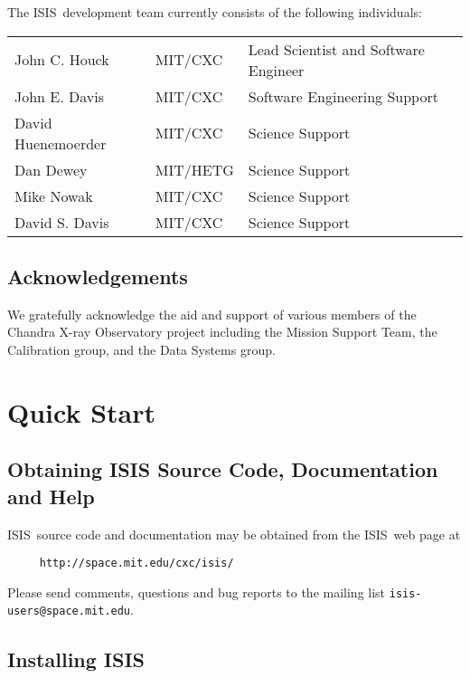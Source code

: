 \documentclass{book}
\newcommand{\isisx}{{\sc ISIS~}}
\begin{document}
The \isisx development team currently consists of the following individuals:

\begin{center}
\begin{tabular}{lll}
John C. Houck  \hspace{2.5cm}  & MIT/CXC \hspace{2.0cm} & Lead Scientist and Software Engineer\\
John E. Davis          & MIT/CXC & Software Engineering Support \\
David Huenemoerder     & MIT/CXC & Science Support \\
Dan Dewey              & MIT/HETG & Science Support \\
Mike Nowak             & MIT/CXC & Science Support \\
David S. Davis         & MIT/CXC & Science Support \\
\end{tabular}
\end{center}

\section{Acknowledgements}

We gratefully acknowledge the aid and support of various members of the
Chandra X-ray Observatory project including the Mission Support Team, the
Calibration group, and the Data Systems group.

\chapter{Quick Start}
\label{chap:quick}

\section{Obtaining ISIS Source Code, Documentation and Help}

\isisx source code and documentation may be obtained from the \isisx web
page at
\begin{verbatim}
     http://space.mit.edu/cxc/isis/
\end{verbatim}

Please send comments, questions and bug reports to the mailing list
{\tt isis-users@space.mit.edu}.

\section{Installing ISIS}
\end{document}
